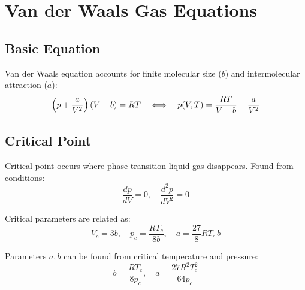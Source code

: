 \documentclass{article}
\begin{document}
\section*{Van der Waals Gas Equations}

\subsection*{Basic Equation}
Van der Waals equation accounts for finite molecular size ($b$) and intermolecular attraction ($a$):
\[
\Bigl(p+\frac{a}{V^2}\Bigr)\,(V-b)=RT \quad\Longleftrightarrow\quad p(V,T)=\frac{RT}{V-b}-\frac{a}{V^2}
\]

\subsection*{Critical Point}
Critical point occurs where phase transition liquid-gas disappears. Found from conditions:
\[
\frac{dp}{dV}=0,\quad \frac{d^2 p}{d V^2}=0
\]

Critical parameters are related as:
\[
V_c=3b,\quad p_c=\frac{RT_c}{8b},\quad a=\frac{27}{8}RT_c\,b
\]

Parameters $a,b$ can be found from critical temperature and pressure:
\[
b=\frac{RT_c}{8p_c},\quad a=\frac{27R^2T_c^2}{64p_c}
\]
\end{document}
